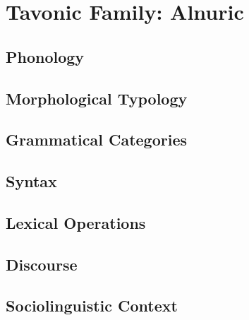 \documentclass[12pt,letterpaper,openany,twoside]{memoir}
\let\originalpart=\part
\def\part{\cleardoublepage\originalpart}
\begin{document}








\part{Tavonic Family: Alnuric}



\chapter{Phonology}

\chapter{Morphological Typology}

\chapter{Grammatical Categories}

\chapter{Syntax}

\chapter{Lexical Operations}

\chapter{Discourse}

\chapter{Sociolinguistic Context}
\end{document}
